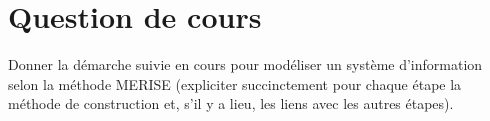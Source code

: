 \section*{Question de cours}

Donner la démarche suivie en cours pour modéliser un système d'information selon la méthode MERISE (expliciter succinctement pour chaque étape la méthode de construction et, s'il y a lieu, les liens avec les autres étapes).
